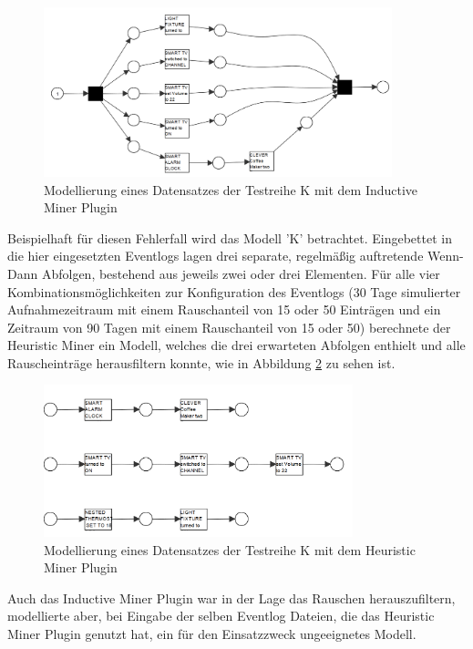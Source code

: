 \begin{figure}[!ht]
    \centering
    \includegraphics[width=0.9\textwidth,]{figures/Appbildungen/K_inductive_erronousPNG.PNG}
    \caption{Modellierung eines Datensatzes der Testreihe K mit dem Inductive Miner Plugin}
    \label{fig:K_inductive}
\end{figure}
Beispielhaft für diesen Fehlerfall wird das Modell 'K' betrachtet. Eingebettet in die hier eingesetzten Eventlogs lagen drei separate, regelmäßig auftretende Wenn-Dann Abfolgen, bestehend aus jeweils zwei oder drei Elementen. 
Für alle vier Kombinationsmöglichkeiten zur Konfiguration des Eventlogs (30 Tage simulierter Aufnahmezeitraum mit einem Rauschanteil von 15 oder 50 Einträgen und ein Zeitraum von  90 Tagen mit einem Rauschanteil von 15 oder 50) berechnete der Heuristic Miner ein Modell, welches die drei erwarteten Abfolgen enthielt und alle Rauscheinträge herausfiltern konnte, wie in Abbildung \ref{fig:K_heuristic} zu sehen ist.
\begin{figure}[!h]
    \centering
    \includegraphics[width=0.8\textwidth,]{figures/Appbildungen/K_heuristic_correct.PNG}
    \caption{Modellierung eines Datensatzes der Testreihe K mit dem Heuristic Miner Plugin}
    \label{fig:K_heuristic}
\end{figure}
Auch das Inductive Miner Plugin war in der Lage das Rauschen herauszufiltern, modellierte aber, bei Eingabe der selben Eventlog Dateien, die das Heuristic Miner Plugin genutzt hat, ein für den Einsatzzweck ungeeignetes Modell. 

